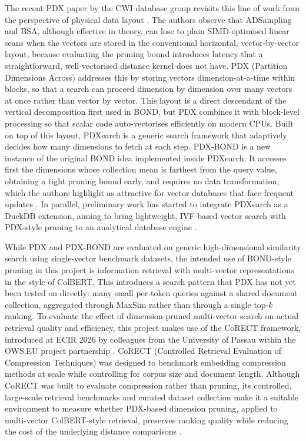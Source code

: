 The recent PDX paper by the CWI database group revisits this line of work from the 
perspective of physical data layout \citep{kuffo2025pdx}. The authors observe that 
ADSampling and BSA, although effective in theory, can lose to plain SIMD-optimised 
linear scans when the vectors are stored in the conventional horizontal, vector-by-vector 
layout, because evaluating the pruning bound introduces latency that a straightforward, 
well-vectorised distance kernel does not have. PDX (Partition Dimensions Across) 
addresses this by storing vectors dimension-at-a-time within blocks, so that a 
search can proceed dimension by dimension over many vectors at once rather than 
vector by vector. This layout is a direct descendant of the vertical decomposition 
first used in BOND, but PDX combines it with block-level processing so that scalar 
code auto-vectorises efficiently on modern CPUs. Built on top of this layout, PDXearch 
is a generic search framework that adaptively decides how many dimensions to fetch at 
each step. PDX-BOND is a new instance of the original BOND idea implemented inside 
PDXearch. It accesses first the dimensions whose collection mean is farthest from the 
query value, obtaining a tight pruning bound early, and requires no data transformation, 
which the authors highlight as attractive for vector databases that face frequent 
updates \citep{kuffo2025pdx}. In parallel, preliminary work has started to integrate 
PDXearch as a DuckDB extension, aiming to bring lightweight, IVF-based vector search 
with PDX-style pruning to an analytical database engine \citep{noorts2025pdxearch}.

While PDX and PDX-BOND are evaluated on generic high-dimensional similarity search using 
single-vector benchmark datasets, the intended use of BOND-style pruning in this project 
is information retrieval with multi-vector representations in the style of ColBERT. This 
introduces a search pattern that PDX has not yet been tested on directly: many small 
per-token queries against a shared document collection, aggregated through MaxSim rather 
than through a single top-$k$ ranking. To evaluate the effect of dimension-pruned 
multi-vector search on actual retrieval quality and efficiency, this project makes use 
of the CoRECT framework, introduced at ECIR 2026 by colleagues from the University of 
Passau within the OWS.EU project partnership \citep{caspari2025corect}. CoRECT 
(Controlled Retrieval Evaluation of Compression Techniques) was designed to benchmark 
embedding compression methods at scale while controlling for corpus size and document 
length. Although CoRECT was built to evaluate compression rather than pruning, its 
controlled, large-scale retrieval benchmarks and curated dataset collection make it a 
suitable environment to measure whether PDX-based dimension pruning, applied to 
multi-vector ColBERT-style retrieval, preserves ranking quality while reducing the cost 
of the underlying distance comparisons \citep{caspari2025corect}.


